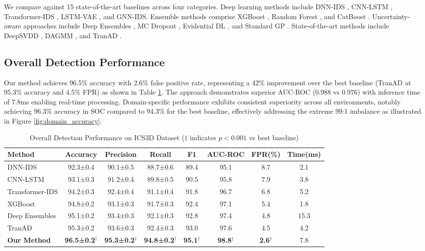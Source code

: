 \documentclass[review,12pt]{elsarticle}
\begin{document}
We compare against 15 state-of-the-art baselines across four categories. Deep learning methods include DNN-IDS \cite{vinayakumar2019deep}, CNN-LSTM \cite{kim2020cnn}, Transformer-IDS \cite{vaswani2017attention}, LSTM-VAE \cite{malhotra2016lstm}, and GNN-IDS. Ensemble methods comprise XGBoost \cite{chen2016xgboost}, Random Forest \cite{breiman2001random}, and CatBoost \cite{prokhorenkova2018catboost}. Uncertainty-aware approaches include Deep Ensembles \cite{lakshminarayanan2017simple}, MC Dropout \cite{gal2016dropout}, Evidential DL \cite{sensoy2018evidential}, and Standard GP \cite{rasmussen2006gaussian}. State-of-the-art methods include DeepSVDD \cite{ruff2018deep}, DAGMM \cite{zong2018deep}, and TranAD \cite{tuli2022tranad}.

\subsection{Overall Detection Performance}

Our method achieves 96.5\% accuracy with 2.6\% false positive rate, representing a 42\% improvement over the best baseline (TranAD at 95.3\% accuracy and 4.5\% FPR) as shown in Table \ref{tab:main_results}. The approach demonstrates superior AUC-ROC (0.988 vs 0.976) with inference time of 7.8ms enabling real-time processing. Domain-specific performance exhibits consistent superiority across all environments, notably achieving 96.3\% accuracy in SOC compared to 94.3\% for the best baseline, effectively addressing the extreme 99:1 imbalance as illustrated in Figure \ref{fig:domain_accuracy}.

\begin{table}[htbp]
\caption{Overall Detection Performance on ICS3D Dataset ($\dagger$ indicates $p<0.001$ vs best baseline)}
\centering
\small
\begin{adjustbox}{width=\textwidth}
\begin{tabular}{lccccccc}
\toprule
\textbf{Method} & \textbf{Accuracy} & \textbf{Precision} & \textbf{Recall} & \textbf{F1} & \textbf{AUC-ROC} & \textbf{FPR(\%)} & \textbf{Time(ms)} \\
\midrule
DNN-IDS & 92.3±0.4 & 90.1±0.5 & 88.7±0.6 & 89.4 & 95.1 & 8.7 & 2.1 \\
CNN-LSTM & 93.1±0.3 & 91.2±0.4 & 89.8±0.5 & 90.5 & 95.8 & 7.9 & 3.8 \\
Transformer-IDS & 94.2±0.3 & 92.4±0.4 & 91.1±0.4 & 91.8 & 96.7 & 6.8 & 5.2 \\
XGBoost & 94.8±0.2 & 93.1±0.3 & 91.7±0.3 & 92.4 & 97.1 & 5.4 & 1.8 \\
Deep Ensembles & 95.1±0.2 & 93.4±0.3 & 92.1±0.3 & 92.8 & 97.4 & 4.8 & 15.3 \\
TranAD & 95.3±0.2 & 93.6±0.3 & 92.4±0.3 & 93.0 & 97.6 & 4.5 & 4.2 \\
\midrule
\textbf{Our Method} & \textbf{96.5±0.2}$^\dagger$ & \textbf{95.3±0.2}$^\dagger$ & \textbf{94.8±0.2}$^\dagger$ & \textbf{95.1}$^\dagger$ & \textbf{98.8}$^\dagger$ & \textbf{2.6}$^\dagger$ & 7.8 \\
\bottomrule
\end{tabular}
\label{tab:main_results}
\end{adjustbox}
\end{table}
\end{document}
